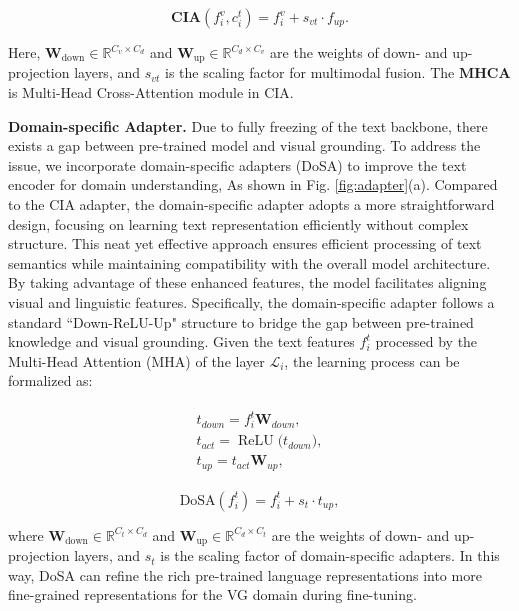 \begin{equation}
 \mathbf{CIA}(f_i^v,c_i^t)= f_i^v + s_{vt} \cdot f_{up}.
\end{equation}

\noindent
Here, $\mathbf{W}_{\text{down}} \in \mathbb{R}^{C_v \times C_d}$ and $\mathbf{W}_{\text{up}} \in \mathbb{R}^{C_d \times C_v}$ are the weights of down- and up-projection layers, and $s_{vt}$ is the scaling factor for multimodal fusion. The $\mathbf{MHCA}$ is Multi-Head Cross-Attention module in CIA.


\noindent
\textbf{Domain-specific Adapter.}
Due to fully freezing of the text backbone, there exists a gap between pre-trained model and visual grounding. To address the issue, we incorporate domain-specific adapters (DoSA) to improve the text encoder for domain understanding, As shown in Fig. \ref{fig:adapter}(a). Compared to the CIA adapter, the domain-specific adapter adopts a more straightforward design, focusing on learning text representation efficiently without complex structure. This neat yet effective approach ensures efficient processing of text semantics while maintaining compatibility with the overall model architecture. By taking advantage of these enhanced features, the model facilitates aligning visual and linguistic features. Specifically, the domain-specific adapter follows a standard ``Down-ReLU-Up" structure to bridge the gap between pre-trained knowledge and visual grounding. Given the text features $f_i^t$ processed by the Multi-Head Attention (MHA) of the layer $\mathcal{L}_{i}$, the learning process can be formalized as:




\begin{equation}
\begin{aligned}
\begin{split}
    t_{down} = f_i^t\mathbf{W}_{down}, \\
    t_{act}=\operatorname{ReLU}\boldsymbol(t_{down}), \\
    t_{up} = t_{act}\mathbf{W}_{up},    
\end{split}
\end{aligned}
\end{equation}

\begin{equation}
\text{DoSA}(f_i^t)=f_i^t + s_t \cdot t_{up},
\end{equation}


\noindent
where $\mathbf{W}_{\text{down}} \in \mathbb{R}^{C_t \times C_d}$ and $\mathbf{W}_{\text{up}} \in \mathbb{R}^{C_d \times C_t}$ are the weights of down- and up-projection layers, and $s_t$ is the scaling factor of domain-specific adapters.
In this way, DoSA can refine the rich pre-trained language representations into more fine-grained representations for the VG domain during fine-tuning.

